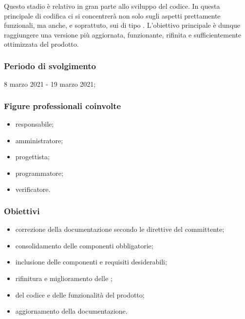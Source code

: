 Questo stadio è relativo in gran parte allo sviluppo del codice. In questa  principale di codifica ci si concentrerà non solo sugli aspetti prettamente funzionali, ma anche, e soprattuto, sui  di tipo . L'obiettivo principale è dunque raggiungere una versione più aggiornata, funzionante, rifinita e sufficientemente ottimizzata del prodotto.
        
        \subsubsection{Periodo di svolgimento}
        8 marzo 2021 - 19 marzo 2021;
        
        \subsubsection{Figure professionali coinvolte}
            \begin{itemize}
                \item responsabile;
                \item amministratore;
                \item progettista;
                \item programmatore;
                \item verificatore.
            \end{itemize}

        \subsubsection{Obiettivi}
        \begin{itemize}
            \item correzione della documentazione secondo le direttive del committente;
            \item consolidamento delle componenti obbligatorie;
            \item inclusione delle componenti e requisiti desiderabili;
            \item rifinitura e miglioramento delle ;
            \item {} del codice e delle funzionalità del prodotto;
            \item aggiornamento della documentazione.
        \end{itemize}